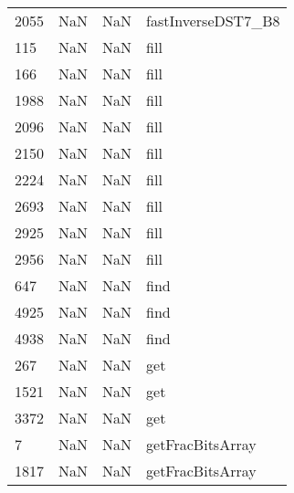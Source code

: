 \begin{tabular}{llll}
2055 &                   NaN &                        NaN &                        fastInverseDST7\_B8 \\
115  &                   NaN &                        NaN &                                      fill \\
166  &                   NaN &                        NaN &                                      fill \\
1988 &                   NaN &                        NaN &                                      fill \\
2096 &                   NaN &                        NaN &                                      fill \\
2150 &                   NaN &                        NaN &                                      fill \\
2224 &                   NaN &                        NaN &                                      fill \\
2693 &                   NaN &                        NaN &                                      fill \\
2925 &                   NaN &                        NaN &                                      fill \\
2956 &                   NaN &                        NaN &                                      fill \\
647  &                   NaN &                        NaN &                                      find \\
4925 &                   NaN &                        NaN &                                      find \\
4938 &                   NaN &                        NaN &                                      find \\
267  &                   NaN &                        NaN &                                       get \\
1521 &                   NaN &                        NaN &                                       get \\
3372 &                   NaN &                        NaN &                                       get \\
7    &                   NaN &                        NaN &                          getFracBitsArray \\
1817 &                   NaN &                        NaN &                          getFracBitsArray \\

\end{tabular}
